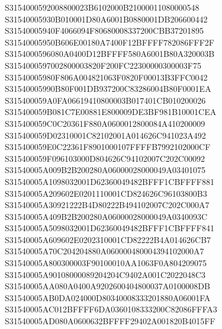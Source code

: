 \documentclass[12pt,a4paper]{article}
\begin{document}
\begin{framed}
{S3154000592008800023B6102000B21000011080000548\newline
S31540005930B010001D80A6001B0880001DB206600442\newline
S31540005940F4066094F80680008337200CBB37201895\newline
S31540005950B606E00180A7400F12BFFFF782086FFF2F\newline
S3154000596080A0400D12BFFFF580A6001B80A320003B\newline
S3154000597002800003820F200FC22300000300003F75\newline
S31540005980F806A004821063F0820F00013B3FFC0042\newline
S31540005990B80F001DB937200C83286004B80F0001EA\newline
S315400059A0FA06619410800003B017401CB010200026\newline
S315400059B081C7E00881E800009DE3BF981B10001CEA\newline
S315400059C0C20361F880A0600012800084A410200009\newline
S315400059D02310001C82102001A014626C941023A492\newline
S315400059E0C22361F8901000107FFFFB7992102000CF\newline
S315400059F096103000D804626C94102007C202C00092\newline
S31540005A009B2B200280A06000028000049A03401075\newline
S31540005A1098032001D62360049482BFFF1CBFFFF881\newline
S31540005A209602E0201110001CD824626C96103800B3\newline
S31540005A30921222B4D80222B494102007C202C000A7\newline
S31540005A409B2B200280A06000028000049A0340093C\newline
S31540005A5098032001D62360049482BFFF1CBFFFF841\newline
S31540005A609602E0202310001CD82222B4A014626CB7\newline
S31540005A70C204204880A060000480004394102000A7\newline
S31540005A800300003F90100010AA1063F0A804209075\newline
S31540005A90108000089204204C9402A001C2022048C3\newline
S31540005AA080A0400A9202600404800037A0100008DB\newline
S31540005AB0DA024000D80340008333201880A06001FA\newline
S31540005AC012BFFFF6DA0360108333200C82086FFFA3\newline
S31540005AD080A0600632BFFFF29402A001820B4015FF\newline
}
\end{framed}
\end{document}
